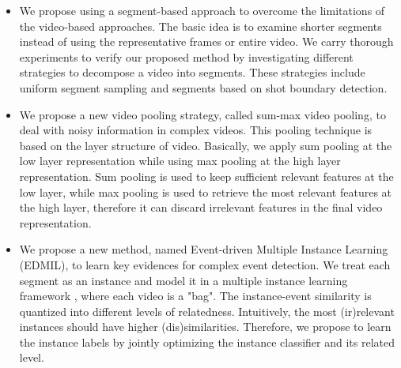 \begin{itemize}
	\item We propose using a segment-based approach to overcome the limitations of  the video-based approaches. The basic idea is to examine shorter segments instead of using the representative frames or entire video. We carry thorough experiments to verify our proposed method by investigating different strategies to decompose a video into segments. These strategies include uniform segment sampling and segments based on shot boundary detection.
	
	\item We propose a new video pooling strategy, called sum-max video pooling, to deal with noisy information in complex videos. This pooling technique is based on the layer structure of video. Basically, we apply sum pooling at the low layer representation while using max pooling at the high layer representation. Sum pooling is used to keep sufficient relevant features at the low layer, while max pooling is used to retrieve the most relevant features at the high layer, therefore it can discard irrelevant features in the final video representation. 
	
	\item We propose a new method, named Event-driven Multiple Instance Learning (EDMIL), to learn key evidences for complex event detection. We treat each segment as an instance and model it in a multiple instance learning framework \cite{andrews2002support}, where each video is a "bag". The instance-event similarity is quantized into different levels of relatedness. Intuitively, the most (ir)relevant instances should have higher (dis)similarities. Therefore, we propose to learn the instance labels by jointly optimizing the instance classifier and its related level.	
	
\end{itemize}
	
